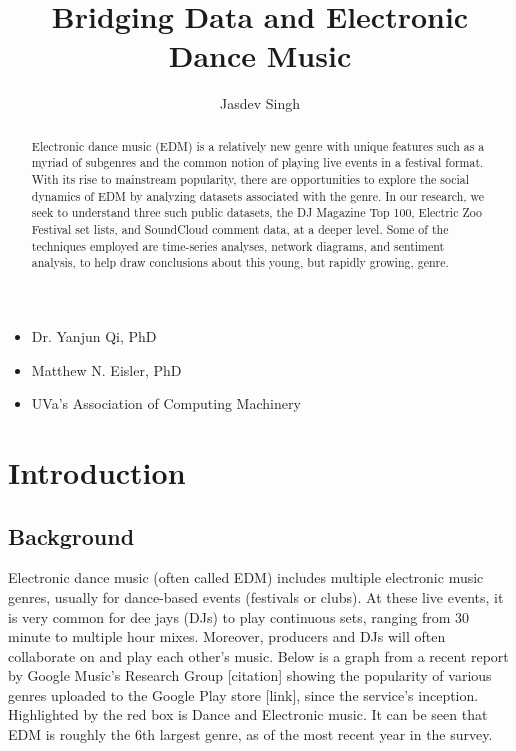 \documentclass[12pt]{dalcsthesis}
\begin{document}
\mcs 
\title{Bridging Data and Electronic Dance Music}
\author{Jasdev Singh}


\nolistoftables
\nolistoffigures

\frontmatter

\begin{abstract}
Electronic dance music (EDM) is a relatively new genre with unique features such as a myriad of subgenres and the common notion of playing live events in a festival format. With its rise to mainstream popularity, there are opportunities to explore the social dynamics of EDM by analyzing datasets associated with the genre. In our research, we seek to understand three such public datasets, the DJ Magazine Top 100, Electric Zoo Festival set lists, and SoundCloud comment data, at a deeper level. Some of the techniques employed are time-series analyses, network diagrams, and sentiment analysis, to help draw conclusions about this young, but rapidly growing, genre.
\end{abstract}

\begin{acknowledgements}
\begin{itemize}
	\item Dr. Yanjun Qi, PhD
	\item Matthew N. Eisler, PhD
	\item UVa's Association of Computing Machinery
\end{itemize}
\end{acknowledgements}

\mainmatter

\chapter{Introduction}

\section{Background}

Electronic dance music (often called EDM) includes multiple electronic music genres, usually for dance-based events (festivals or clubs). At these live events, it is very common for dee jays (DJs) to play continuous sets, ranging from 30 minute to multiple hour mixes. Moreover, producers and DJs will often collaborate on and play each other's music. Below is a graph from a recent report by Google Music's Research Group [citation] showing the popularity of various genres uploaded to the Google Play store [link], since the service's inception. Highlighted by the red box is Dance and Electronic music. It can be seen that EDM is roughly the 6th largest genre, as of the most recent year in the survey.
\end{document}
